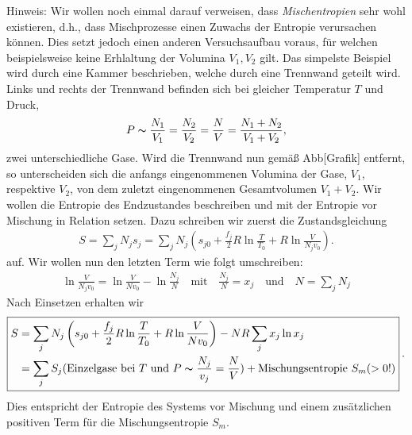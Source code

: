 Hinweis: Wir wollen noch einmal darauf verweisen, dass \emph{Mischentropien} sehr wohl existieren, d.h., dass Mischprozesse einen Zuwachs der Entropie verursachen können. Dies setzt jedoch einen anderen Versuchsaufbau voraus, für welchen beispielsweise keine Erhlaltung der Volumina $V_1,V_2$ gilt. Das simpelste Beispiel wird durch eine Kammer beschrieben, welche durch eine Trennwand geteilt wird. Links und rechts der Trennwand befinden sich bei gleicher Temperatur $T$ und Druck, 
\begin{align*}
    P\thicksim\frac{N_1}{V_1}=\frac{N_2}{V_2}=\frac{N}{V}=\frac{N_1+N_2}{V_1+V_2},
\end{align*}
zwei unterschiedliche Gase. Wird die Trennwand nun gemäß Abb[Grafik] entfernt, so unterscheiden sich die anfangs eingenommenen Volumina der Gase, $V_1$, respektive $V_2$, von dem zuletzt eingenommenen Gesamtvolumen $V_1+V_2$. 
Wir wollen die Entropie des Endzustandes beschreiben und mit der Entropie vor Mischung in Relation setzen. Dazu schreiben wir zuerst die Zustandsgleichung 
\begin{align*}
    S=\sum_jN_js_j=\sum_jN_j\left(s_{j0}+\frac{f_j}{2}R\ln\frac{T}{T_0}+R\ln\frac{V}{N_jv_0}\right).
\end{align*}
auf. Wir wollen nun den letzten Term wie folgt umschreiben: 
\begin{align*}
    \ln\frac{V}{N_jv_0}=\ln\frac{V}{Nv_0}-\ln\frac{N_j}{N}\quad\text{mit}\quad\frac{N_j}{N}=x_j\quad\text{und}\quad N=\sum_jN_j
\end{align*}
Nach Einsetzen erhalten wir 
\begin{align*}
    \boxed{
    \begin{aligned}
        S&=\sum_jN_j\left(s_{j0}+\frac{f_j}{2}R\ln\frac{T}{T_0}+R\ln\frac{V}{Nv_0}\right)-NR\sum_jx_j\ln x_j\\
        &=\sum_jS_j(\text{Einzelgase bei $T$ und }P\thicksim \frac{N_j}{v_j}=\frac{N}{V})+\text{Mischungsentropie $S_m(>0!)$}
    \end{aligned}
    }\:.
\end{align*}
Dies entspricht der Entropie des Systems vor Mischung und einem zusätzlichen positiven Term für die Mischungsentropie $S_m$.
